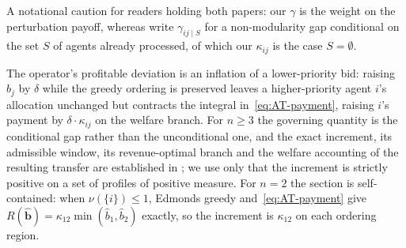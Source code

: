 \documentclass[acmsmall,nonacm,screen]{acmart}
\theoremstyle{acmplain}%
\theoremstyle{acmdefinition}%
\numberwithin{equation}{section}
\begin{document}
A notational caution for readers holding both papers: our $\gamma$ is the weight on the perturbation payoff, whereas \citet{loven2026trilemma} write $\gamma_{ij \mid S}$ for a non-modularity gap conditional on the set $S$ of agents already processed, of which our $\kappa_{ij}$ is the case $S = \emptyset$.

The operator's profitable deviation is an inflation of a lower-priority bid: raising $\hat{b}_j$ by $\delta$ while the greedy ordering is preserved leaves a higher-priority agent $i$'s allocation unchanged but contracts the integral in~\eqref{eq:AT-payment}, raising $i$'s payment by $\delta \cdot \kappa_{ij}$ on the welfare branch. For $n \geq 3$ the governing quantity is the conditional gap rather than the unconditional one, and the exact increment, its admissible window, its revenue-optimal branch and the welfare accounting of the resulting transfer are established in \citet{loven2026trilemma}; we use only that the increment is strictly positive on a set of profiles of positive measure. For $n = 2$ the section is self-contained: when $\nu(\{i\}) \leq 1$, Edmonds greedy and~\eqref{eq:AT-payment} give $R(\hat{\mathbf{b}}) = \kappa_{12}\min(\hat{b}_1, \hat{b}_2)$ exactly, so the increment is $\kappa_{12}$ on each ordering region.
\end{document}

